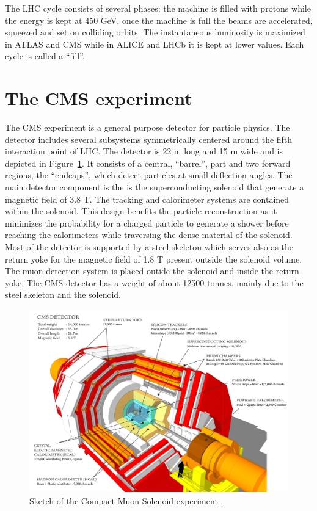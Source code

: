 The LHC cycle consists of several phases: the machine is filled with protons while the energy is kept at
450 GeV, once the machine is full the beams are accelerated, squeezed and set on colliding orbits.
The instantaneous luminosity is maximized in ATLAS and CMS while in ALICE and LHCb it is kept
at lower values. Each cycle is called a ``fill''.

\section{The CMS experiment}

The CMS experiment is a general purpose detector for particle physics. The detector
includes several subsystems symmetrically centered around
the fifth interaction point of LHC. The detector is 22 m long and 15 m wide and is depicted in Figure~\ref{fig:CMS}.
It consists of a central, ``barrel'', part and two forward regions, the ``endcaps'', which
detect particles at small deflection angles.
The main detector component is the is the
superconducting solenoid that generate a magnetic field of 3.8 T. The tracking and calorimeter
systems are contained within the solenoid. This design benefits
the particle reconstruction as it minimizes the probability for a charged particle to
generate a shower before reaching the calorimeters while traversing the dense material of
the solenoid. Most of the detector is supported by
a steel skeleton which serves also as the return yoke for the magnetic field of 1.8 T
present outside the solenoid volume.
The muon detection system is placed outide the solenoid and inside the return yoke. The CMS detector has a weight
of about 12500 tonnes, mainly due to the steel skeleton and the solenoid.

\begin{figure}[!h]
  \includegraphics[width = 1.\textwidth]{figures/cms/cms_layout.png}
  \caption{Sketch of the Compact Muon Solenoid experiment \cite{cms_sketch}.}
  \label{fig:CMS}  
\end{figure}


